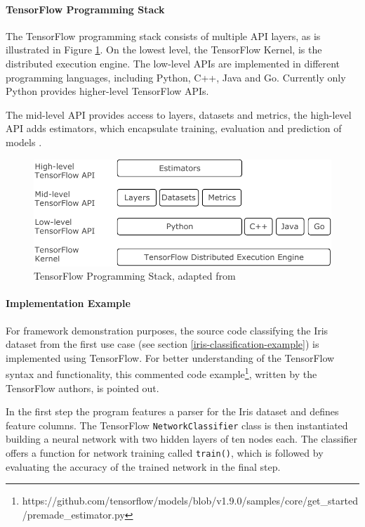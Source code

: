 \paragraph{TensorFlow Programming
Stack}\label{tensorflow-programming-stack}

The TensorFlow programming stack consists of multiple API layers, as is
illustrated in Figure \ref{tensorflow-api-levels}. On the lowest level,
the TensorFlow Kernel, is the distributed execution engine. The
low-level APIs are implemented in different programming languages,
including Python, C++, Java and Go. Currently only Python provides
higher-level TensorFlow APIs.

The mid-level API provides access to layers, datasets and metrics, the
high-level API adds estimators, which encapsulate training, evaluation
and prediction of models \cite{tensorflow-estimators}.

\begin{figure}
\centering
\includegraphics{images/tensorflow-api-levels}
\caption{TensorFlow Programming Stack, adapted from
\cite{tensorflow-gettingstarted} \label{tensorflow-api-levels}}
\end{figure}

\paragraph{Implementation Example}\label{implementation-example}

For framework demonstration purposes, the source code classifying the
Iris dataset from the first use case (see section
\ref{iris-classification-example}) is implemented using TensorFlow. For
better understanding of the TensorFlow syntax and functionality, this
commented code example\footnote{https://github.com/tensorflow/models/blob/v1.9.0/samples/core/get\_started/premade\_estimator.py},
written by the TensorFlow authors, is pointed out.

In the first step the program features a parser for the Iris dataset and
defines feature columns. The TensorFlow \texttt{NetworkClassifier} class
is then instantiated building a neural network with two hidden layers of
ten nodes each. The classifier offers a function for network training
called \texttt{train()}, which is followed by evaluating the accuracy of
the trained network in the final step.

